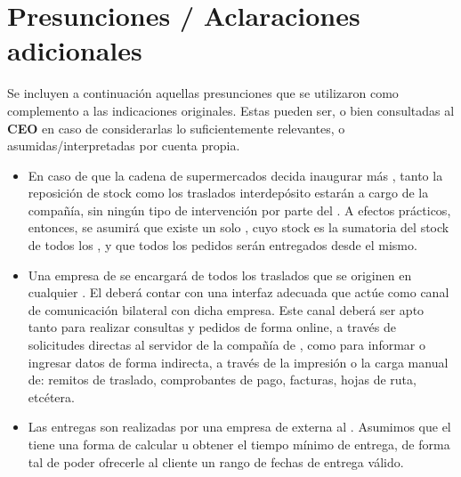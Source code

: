 
\section{Presunciones / Aclaraciones adicionales}

Se incluyen a continuación aquellas presunciones que se utilizaron como
complemento a las indicaciones originales. Estas pueden ser, o bien consultadas
al \textbf{CEO} en caso de considerarlas lo suficientemente relevantes, o
asumidas/interpretadas por cuenta propia.

\begin{itemize}

  \item En caso de que la cadena de supermercados decida inaugurar más
\textbf{}, tanto la reposición de stock como los traslados
interdepósito estarán a cargo de la compañía, sin ningún tipo de intervención
por parte del \textbf{}. A efectos prácticos, entonces, se asumirá
que existe un solo \textbf{}, cuyo stock es la sumatoria del stock
de todos los \textbf{}, y que todos los pedidos serán entregados
desde el mismo.

  \item Una empresa de \textbf{} se encargará de todos los
traslados que se originen en cualquier \textbf{}. El
\textbf{} deberá contar con una interfaz adecuada que actúe como
canal de comunicación bilateral con dicha empresa. Este canal deberá ser apto
tanto para realizar consultas y pedidos de forma online, a través de solicitudes
directas al servidor de la compañía de \textbf{}, como para
informar o ingresar datos de forma indirecta, a través de la impresión o la
carga manual de: remitos de traslado, comprobantes de pago, facturas, hojas de
ruta, etcétera.

  \item Las entregas son realizadas por una empresa de
\textbf{} externa al \textbf{}. Asumimos que el
\textbf{} tiene una forma de calcular u obtener el tiempo mínimo
de entrega, de forma tal de poder ofrecerle al cliente un rango de fechas de
entrega válido. 


\end{itemize}

